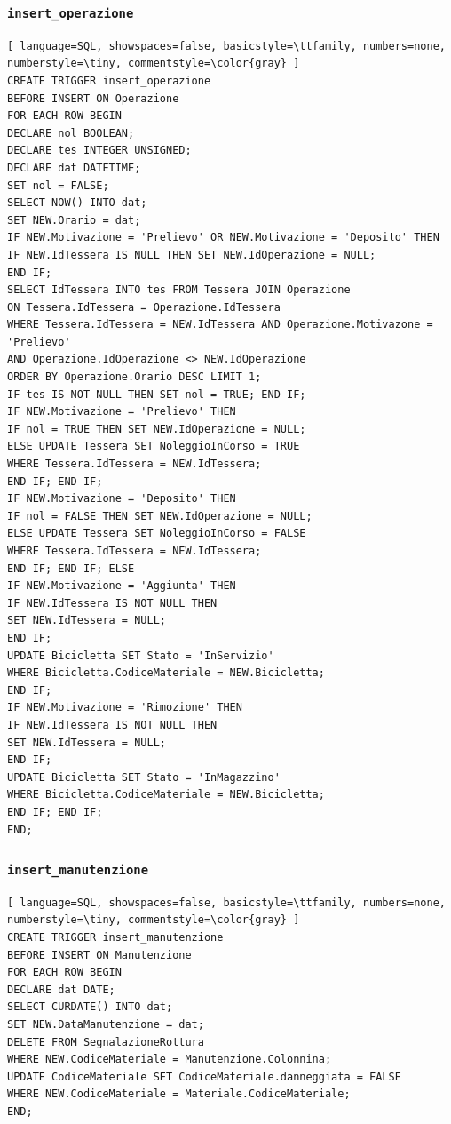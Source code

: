 \documentclass[a4paper,twoside]{article}
\begin{document}
\subsubsection{\texttt{insert\_operazione}}
\begin{lstlisting}[ language=SQL, showspaces=false, basicstyle=\ttfamily, numbers=none, numberstyle=\tiny, commentstyle=\color{gray} ]
CREATE TRIGGER insert_operazione
BEFORE INSERT ON Operazione
FOR EACH ROW BEGIN
DECLARE nol BOOLEAN;
DECLARE tes INTEGER UNSIGNED;
DECLARE dat DATETIME;
SET nol = FALSE;
SELECT NOW() INTO dat;
SET NEW.Orario = dat;
IF NEW.Motivazione = 'Prelievo' OR NEW.Motivazione = 'Deposito' THEN
IF NEW.IdTessera IS NULL THEN SET NEW.IdOperazione = NULL;
END IF;
SELECT IdTessera INTO tes FROM Tessera JOIN Operazione
ON Tessera.IdTessera = Operazione.IdTessera
WHERE Tessera.IdTessera = NEW.IdTessera AND Operazione.Motivazone = 'Prelievo'
AND Operazione.IdOperazione <> NEW.IdOperazione
ORDER BY Operazione.Orario DESC LIMIT 1;
IF tes IS NOT NULL THEN SET nol = TRUE; END IF;
IF NEW.Motivazione = 'Prelievo' THEN
IF nol = TRUE THEN SET NEW.IdOperazione = NULL;
ELSE UPDATE Tessera SET NoleggioInCorso = TRUE
WHERE Tessera.IdTessera = NEW.IdTessera;
END IF; END IF;
IF NEW.Motivazione = 'Deposito' THEN
IF nol = FALSE THEN SET NEW.IdOperazione = NULL;
ELSE UPDATE Tessera SET NoleggioInCorso = FALSE
WHERE Tessera.IdTessera = NEW.IdTessera;
END IF; END IF; ELSE
IF NEW.Motivazione = 'Aggiunta' THEN
IF NEW.IdTessera IS NOT NULL THEN
SET NEW.IdTessera = NULL;
END IF;
UPDATE Bicicletta SET Stato = 'InServizio'
WHERE Bicicletta.CodiceMateriale = NEW.Bicicletta;
END IF;
IF NEW.Motivazione = 'Rimozione' THEN
IF NEW.IdTessera IS NOT NULL THEN
SET NEW.IdTessera = NULL;
END IF;
UPDATE Bicicletta SET Stato = 'InMagazzino'
WHERE Bicicletta.CodiceMateriale = NEW.Bicicletta;
END IF; END IF;
END;
\end{lstlisting}
\subsubsection{\texttt{insert\_manutenzione}}
\begin{lstlisting}[ language=SQL, showspaces=false, basicstyle=\ttfamily, numbers=none, numberstyle=\tiny, commentstyle=\color{gray} ]
CREATE TRIGGER insert_manutenzione
BEFORE INSERT ON Manutenzione
FOR EACH ROW BEGIN
DECLARE dat DATE;
SELECT CURDATE() INTO dat;
SET NEW.DataManutenzione = dat;
DELETE FROM SegnalazioneRottura
WHERE NEW.CodiceMateriale = Manutenzione.Colonnina;
UPDATE CodiceMateriale SET CodiceMateriale.danneggiata = FALSE
WHERE NEW.CodiceMateriale = Materiale.CodiceMateriale;
END;
\end{lstlisting}
\end{document}
